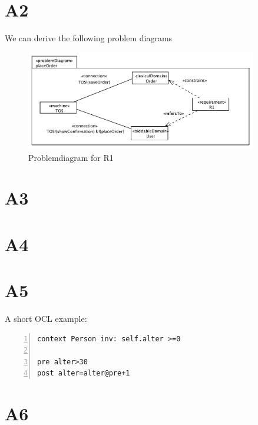 \documentclass[a4paper,10pt,titlepage,bibtotoc,bibtotocnumbered]{scrreprt}
\begin{document}
\newpage\section{A2}
We can derive the following problem diagrams

\begin{figure}[H]
	\centering
  	\includegraphics[width=0.9\textwidth]{figures/A2/pdR1.pdf}
	\caption{Problemdiagram for R1}
	\label{figure:pdR1}
\end{figure}

\newpage\section{A3}

\newpage\section{A4}

\newpage\section{A5}
A short OCL example:\\
\lstset{language=OCL}          %

\begin{lstlisting}[frame=single,breaklines=true,numbers=left,numberfirstline=true]
context Person inv: self.alter >=0

pre alter>30
post alter=alter@pre+1

\end{lstlisting}

\newpage\section{A6}
\end{document}
